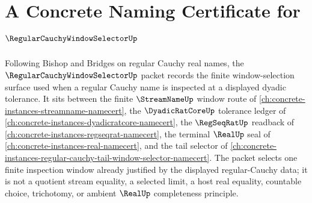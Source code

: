 \chapter{A Concrete Naming Certificate for $\RegularCauchyWindowSelectorUp$}
\label{ch:concrete-instances-regular-cauchy-window-selector-namecert}

Following Bishop and Bridges on regular Cauchy real names, the $\RegularCauchyWindowSelectorUp$ packet records the finite window-selection surface used when a regular Cauchy name is inspected at a displayed dyadic tolerance. It sits between the finite $\StreamNameUp$ window route of \autoref{ch:concrete-instances-streamname-namecert}, the $\DyadicRatCoreUp$ tolerance ledger of \autoref{ch:concrete-instances-dyadicratcore-namecert}, the $\RegSeqRatUp$ readback of \autoref{ch:concrete-instances-regseqrat-namecert}, the terminal $\RealUp$ seal of \autoref{ch:concrete-instances-real-namecert}, and the tail selector of \autoref{ch:concrete-instances-regular-cauchy-tail-window-selector-namecert}. The packet selects one finite inspection window already justified by the displayed regular-Cauchy data; it is not a quotient stream equality, a selected limit, a host real equality, countable choice, trichotomy, or ambient $\RealUp$ completeness principle.

